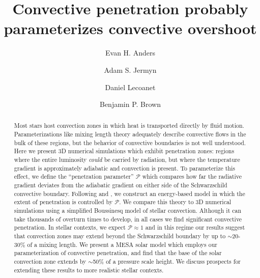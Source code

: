\documentclass[twocolumn]{aastex631}
\newcommand{\mP}{\ensuremath{\mathcal{P}}}
\begin{document}
\title{Convective penetration probably parameterizes convective overshoot}
\author[0000-0002-3433-4733]{Evan H. Anders}
\author[0000-0001-5048-9973]{Adam S. Jermyn}
\author[0000-0002-7635-9728]{Daniel Lecoanet}
\author[0000-0001-8935-219X]{Benjamin P. Brown}


\begin{abstract}
Most stars host convection zones in which heat is transported directly by fluid motion.
Parameterizations like mixing length theory adequately describe convective flows in the bulk of these regions, but the behavior of convective boundaries is not well understood.
Here we present 3D numerical simulations which exhibit penetration zones: regions where the entire luminosity \emph{could} be carried by radiation, but where the temperature gradient is approximately adiabatic and convection is present.
To parameterize this effect, we define the ``penetration parameter'' $\mP$ which compares how far the radiative gradient deviates from the adiabatic gradient on either side of the Schwarzschild convective boundary.
Following \citet{roxburgh1989} and \citet{zahn1991}, we construct an energy-based model in which the extent of penetration is controlled by $\mP$.
We compare this theory to 3D numerical simulations using a simplified Boussinesq model of stellar convection.
Although it can take thousands of overturn times to develop, in all cases we find significant convective penetration.
In stellar contexts, we expect $\mathcal{P} \approx 1$ and in this regime our results suggest that convection zones may extend beyond the Schwarzschild boundary by up to $\sim$20-30\% of a mixing length.
We present a MESA solar model which employs our parameterization of convective penetration, and find that the base of the solar convection zone extends by $\sim$50\% of a pressure scale height.
We discuss prospects for extending these results to more realistic stellar contexts.
\end{abstract}
\end{document}
